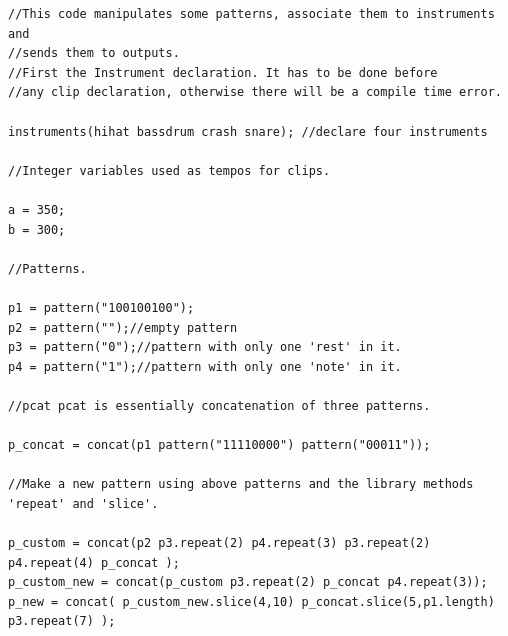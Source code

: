 \documentclass[11pt,twoside]{article}
\begin{document}
\begin{verbatim}
//This code manipulates some patterns, associate them to instruments and
//sends them to outputs.
//First the Instrument declaration. It has to be done before 
//any clip declaration, otherwise there will be a compile time error.

instruments(hihat bassdrum crash snare); //declare four instruments

//Integer variables used as tempos for clips.

a = 350;
b = 300;

//Patterns.

p1 = pattern("100100100");
p2 = pattern("");//empty pattern
p3 = pattern("0");//pattern with only one 'rest' in it.
p4 = pattern("1");//pattern with only one 'note' in it.

//pcat pcat is essentially concatenation of three patterns.

p_concat = concat(p1 pattern("11110000") pattern("00011"));

//Make a new pattern using above patterns and the library methods 'repeat' and 'slice'. 

p_custom = concat(p2 p3.repeat(2) p4.repeat(3) p3.repeat(2) p4.repeat(4) p_concat );
p_custom_new = concat(p_custom p3.repeat(2) p_concat p4.repeat(3));
p_new = concat( p_custom_new.slice(4,10) p_concat.slice(5,p1.length) p3.repeat(7) );

\end{verbatim}
\clearpage
\end{document}
